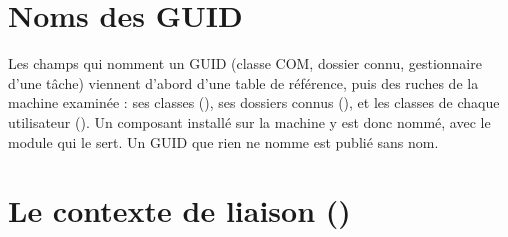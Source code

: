 \documentclass[11pt,a4paper,oneside]{report}
\begin{document}
\section{Noms des GUID}

Les champs qui nomment un GUID (classe COM, dossier connu, gestionnaire d'une
tâche) viennent d'abord d'une table de référence, puis des ruches de la machine
examinée : ses classes (), ses dossiers connus (), et les classes de
chaque utilisateur (). Un composant installé sur la
machine y est donc nommé, avec le module qui le sert. Un GUID que rien ne nomme
est publié sans nom.

\section{Le contexte de liaison ()}
\end{document}
